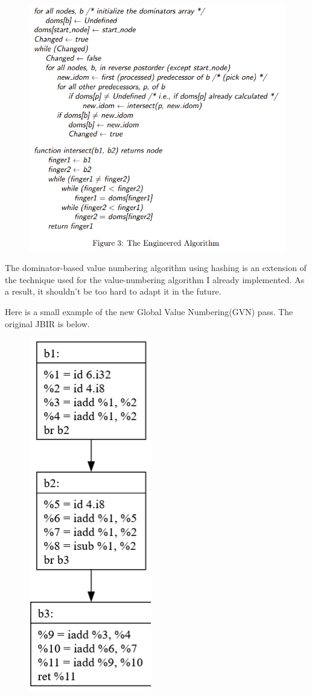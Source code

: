 \documentclass[11pt, a4paper, titlepage]{article}
\begin{document}
\begin{figure}[H]
  \centering
  \includegraphics[scale=0.4]{images/i17.png}
\end{figure}

The dominator-based value numbering algorithm using hashing is an extension of the technique used for the value-numbering algorithm I already implemented. As a result, it shouldn't be too hard to adapt it in the future.

Here is a small example of the new Global Value Numbering(GVN) pass. The original JBIR is below.

\begin{figure}[H]
  \centering
  \includegraphics[scale=0.3]{images/i18.png}
\end{figure}
\end{document}
